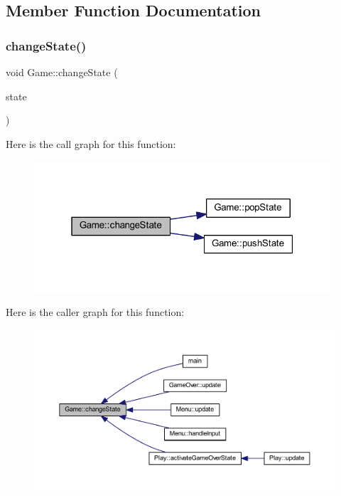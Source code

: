 \subsection{Member Function Documentation}
\mbox{\label{class_game_a8683b16995200bd11d95efc372e6722a}} 
\subsubsection{\texorpdfstring{change\+State()}{changeState()}}
{\footnotesize\ttfamily void Game\+::change\+State (\begin{DoxyParamCaption}\item[{\hyperlink{class_game_state}{Game\+State} $\ast$}]{state }\end{DoxyParamCaption})}

Here is the call graph for this function\+:
\nopagebreak
\begin{figure}[H]
\begin{center}
\leavevmode
\includegraphics[width=313pt]{class_game_a8683b16995200bd11d95efc372e6722a_cgraph}
\end{center}
\end{figure}
Here is the caller graph for this function\+:
\nopagebreak
\begin{figure}[H]
\begin{center}
\leavevmode
\includegraphics[width=350pt]{class_game_a8683b16995200bd11d95efc372e6722a_icgraph}
\end{center}
\end{figure}
\mbox{\label{class_game_aede5f46c8c7bbbaf8459eeec397a11e7}} 
